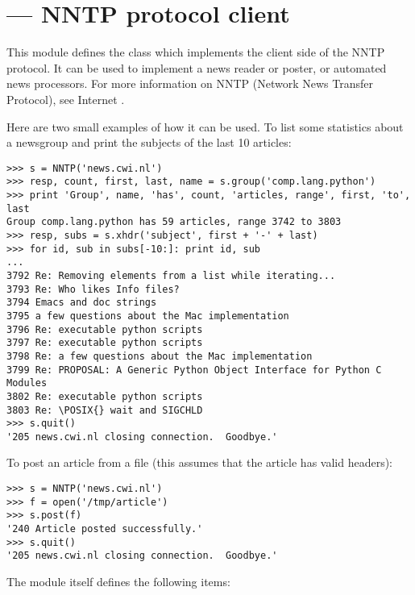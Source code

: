 \section{ ---
         NNTP protocol client}



This module defines the class  which implements the client
side of the NNTP protocol.  It can be used to implement a news reader
or poster, or automated news processors.  For more information on NNTP
(Network News Transfer Protocol), see Internet .

Here are two small examples of how it can be used.  To list some
statistics about a newsgroup and print the subjects of the last 10
articles:

\begin{verbatim}
>>> s = NNTP('news.cwi.nl')
>>> resp, count, first, last, name = s.group('comp.lang.python')
>>> print 'Group', name, 'has', count, 'articles, range', first, 'to', last
Group comp.lang.python has 59 articles, range 3742 to 3803
>>> resp, subs = s.xhdr('subject', first + '-' + last)
>>> for id, sub in subs[-10:]: print id, sub
... 
3792 Re: Removing elements from a list while iterating...
3793 Re: Who likes Info files?
3794 Emacs and doc strings
3795 a few questions about the Mac implementation
3796 Re: executable python scripts
3797 Re: executable python scripts
3798 Re: a few questions about the Mac implementation 
3799 Re: PROPOSAL: A Generic Python Object Interface for Python C Modules
3802 Re: executable python scripts 
3803 Re: \POSIX{} wait and SIGCHLD
>>> s.quit()
'205 news.cwi.nl closing connection.  Goodbye.'
\end{verbatim}

To post an article from a file (this assumes that the article has
valid headers):

\begin{verbatim}
>>> s = NNTP('news.cwi.nl')
>>> f = open('/tmp/article')
>>> s.post(f)
'240 Article posted successfully.'
>>> s.quit()
'205 news.cwi.nl closing connection.  Goodbye.'
\end{verbatim}

The module itself defines the following items:

